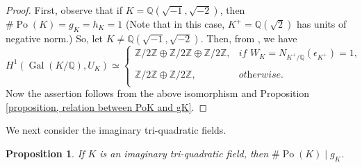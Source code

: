 \documentclass[12pt]{amsart}
\newtheorem{proposition}[theorem]{Proposition}
\theoremstyle{definition}
\numberwithin{equation}{section}
\DeclareMathOperator{\Po}{Po}
\DeclareMathOperator{\Gal}{Gal}
\begin{document}
\begin{proof}
	First, observe that if $K=\mathbb{Q}(\sqrt{-1},\sqrt{-2})$, then $\# \Po(K)=g_K=h_K=1$ (Note that in this case, $K^+=\mathbb{Q}(\sqrt{2})$ has units of negative norm.) So, let $K \neq \mathbb{Q}(\sqrt{-1},\sqrt{-2})$. Then,
from \cite[Lemma 4.3]{Zantema}, we have
\begin{equation*}
	H^1(\Gal(K/\mathbb{Q}),U_K) \simeq \left\{
	\begin{array}{ll}
		\mathbb{Z}/2\mathbb{Z} \oplus \mathbb{Z}/2\mathbb{Z} \oplus \mathbb{Z}/2\mathbb{Z}, & \textit{if} \, \, W_K=N_{K^+/\mathbb{Q}}(\epsilon_{K^+})=1,\\
		& \\
		\mathbb{Z}/2\mathbb{Z} \oplus \mathbb{Z}/2\mathbb{Z} , & \textit{otherwise.} \\	
	\end{array}
	\right.
\end{equation*}
Now the assertion follows from the above isomorphism and Proposition \ref{proposition, relation between PoK and gK}.
\end{proof}

We next consider the imaginary tri-quadratic fields.


\begin{proposition} \label{proposition, Po(K) and gK for K imaginary tri-quadratic}
If $K$ is an imaginary tri-quadratic field, then $\# \Po(K) \mid g_K$.
\end{proposition}
\end{document}
